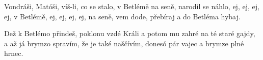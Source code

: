 \IncludeLilypond

Vondráši, Matóši,
víš-li, co se stalo,
v Betlémě na seně,
narodil se náhlo,
ej, ej, ej, ej, v Betlémě,
ej, ej, ej, ej, na seně,
vem dode, přebíraj
a do Betléma hybaj.

Dež k Betlémo přindeš,
poklonu vzdé Králi
a potom mu zahré
na té staré gajdy,
a až já brymzo spravím,
že je také naščívím,
donesó pár vajec
a brymze plné hrnec.
